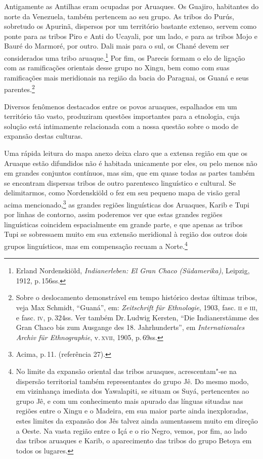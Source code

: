 Antigamente as Antilhas eram ocupadas
por Aruaques. Os Guajiro, habitantes do norte da Venezuela, também
pertencem ao seu grupo. As tribos do Purús, sobretudo os Apurinã,
dispersos por um território bastante extenso, servem como ponte para as
tribos Piro e Anti do Ucayali, por um lado, e para as tribos Mojo e
Bauré do Marmoré, por outro. Dali mais para o sul, os Chané devem ser
considerados uma tribo aruaque.\footnote{Erland Nordenskiöld,
  \textit{Indianerleben: El Gran Chaco (Südamerika)}, Leipzig, 1912, p.\,156ss.} Por fim, os Parecis formam o elo de ligação com as
ramificações orientais desse grupo no Xingu, bem como com suas
ramificações mais meridionais na região da bacia do Paraguai, os Guaná e
seus parentes.\footnote{Sobre o deslocamento demonstrável em tempo
  histórico destas últimas tribos, veja Max Schmidt, ``Guaná'', em:
  \textit{Zeitschrift für Ethnologie}, 1903, fasc. \textsc{ii} e \textsc{iii}, e fasc. \textsc{iv}, p.\,324ss. Ver também Dr.\,Ludwig Kersten, ``Die Indianerstämme des
  Gran Chaco bis zum Ausgange des 18. Jahrhunderts'', em
  \textit{Internationales Archiv für Ethnographie}, v.\,\textsc{xvii}, 1905, p.\,69ss.}

Diversos fenômenos destacados entre os povos aruaques, espalhados em um
território tão vasto, produziram questões importantes para a etnologia,
cuja solução está intimamente relacionada com a nossa questão sobre o
modo de expansão destas culturas.

Uma rápida leitura do mapa anexo deixa claro que a extensa região em
que os Aruaque estão difundidos não é habitada unicamente por eles, ou
pelo menos não em grandes conjuntos contínuos, mas sim, que em quase
todas as partes também se encontram dispersas tribos de outro
parentesco linguístico e cultural. Se delimitarmos, como Nordenskiöld o
fez em seu pequeno mapa de visão geral acima mencionado,\footnote{Acima,
  p.\,11. (referência 27).} as grandes regiões linguísticas dos Aruaques,
Karib e Tupi por linhas de contorno, assim poderemos ver que estas
grandes regiões linguísticas coincidem espacialmente em grande parte, e
que apenas as tribos Tupi se sobressaem muito em sua extensão meridional
à região dos outros dois grupos linguísticos, mas em compensação recuam
a Norte.\footnote{No limite da expansão oriental das tribos aruaques,
acrescentam"-se na dispersão territorial também representantes do grupo
Jê. Do mesmo modo, em vizinhança imediata dos Yawalapiti, se situam os Suyá,
pertencentes ao grupo Jê, e com um conhecimento mais apurado das línguas
situadas nas regiões entre o Xingu e o Madeira, em sua maior parte ainda
inexploradas, estes limites da expansão dos Jês talvez ainda aumentassem
muito em direção a Oeste. Na vasta região entre o Içá e o rio Negro,
vemos, por fim, ao lado das tribos aruaques e Karib, o aparecimento das
tribos do grupo Betoya em todos os lugares.}

